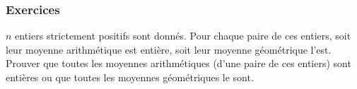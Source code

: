 
\subsubsection{Exercices}

\begin{exo}
$n$ entiers strictement positifs sont donnés. Pour chaque paire de ces entiers, soit leur moyenne arithmétique est entière, soit leur moyenne géométrique l'est. Prouver que toutes les moyennes arithmétiques (d'une paire de ces entiers) sont entières ou que toutes les moyennes géométriques le sont.
\end{exo}


